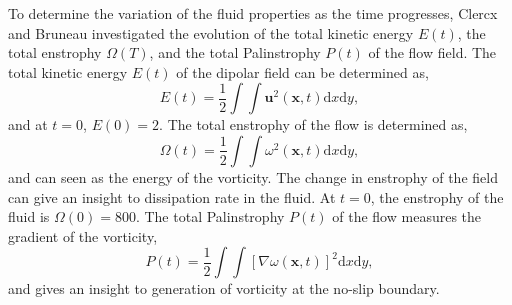 To determine the variation of the fluid properties as the time progresses, Clercx and Bruneau investigated the evolution of the total kinetic energy $E(t)$, the total enstrophy $\Omega(T)$, and the total Palinstrophy $P(t)$ of the flow field. The total kinetic energy $E(t)$ of the dipolar field can be determined as,
	\begin{equation}
	E(t) = \frac{1}{2} \int\int \mathbf{u}^2(\mathbf{x},t) \mathrm{d}x\mathrm{d}y,
	\end{equation}
and at $t=0$, $E(0) = 2$. The total enstrophy of the flow is determined as, 
	\begin{equation}
	\Omega(t) = \frac{1}{2}\int\int\omega^2(\mathbf{x},t) \mathrm{d}x\mathrm{d}y,
	\end{equation}	
and can seen as the energy of the vorticity. The change in enstrophy of the field can give an insight to dissipation rate in the fluid. At $t=0$, the enstrophy of the fluid is $\Omega(0)=800$. The total Palinstrophy $P(t)$ of the flow measures the gradient of the vorticity, 
	\begin{equation}
	P(t) = \frac{1}{2}\int\int\left[\nabla\omega(\mathbf{x},t)\right]^2 \mathrm{d}x\mathrm{d}y,
	\end{equation}
and gives an insight to generation of vorticity at the no-slip boundary.

	
	
